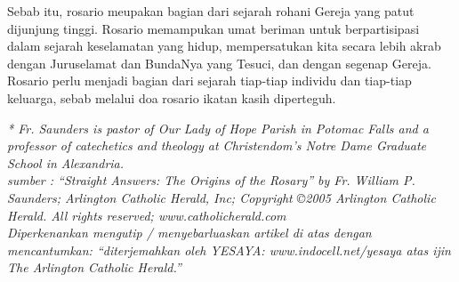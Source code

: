 Sebab itu, rosario meupakan bagian dari sejarah rohani Gereja yang patut dijunjung tinggi. Rosario memampukan umat beriman untuk berpartisipasi dalam sejarah keselamatan yang hidup, mempersatukan kita secara lebih akrab dengan Juruselamat dan BundaNya yang Tesuci, dan dengan segenap Gereja. Rosario perlu menjadi bagian dari sejarah tiap-tiap individu dan tiap-tiap keluarga, sebab melalui doa rosario ikatan kasih diperteguh.

\textit{
* Fr. Saunders is pastor of Our Lady of Hope Parish in Potomac Falls and a professor of catechetics and theology at Christendom's Notre Dame Graduate School in Alexandria.\\
sumber : ``Straight Answers: The Origins of the Rosary'' by Fr. William P. Saunders; Arlington Catholic Herald, Inc; Copyright ©2005 Arlington Catholic Herald. All rights reserved; www.catholicherald.com\\
Diperkenankan mengutip / menyebarluaskan artikel di atas dengan mencantumkan: ``diterjemahkan oleh YESAYA: www.indocell.net/yesaya atas ijin The Arlington Catholic Herald.''}